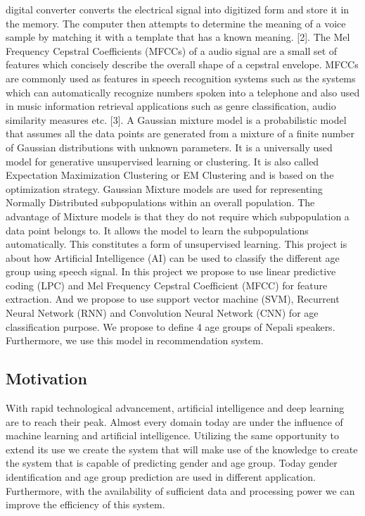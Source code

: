\documentclass[a4paper,12pt]{article}
\begin{document}
{digital converter converts the electrical signal into digitized form and store it in the memory.
The computer then attempts to determine the meaning of a voice sample by matching it with a
template that has a known meaning. [2]. The Mel Frequency Cepstral Coefficients (MFCCs)
of a audio signal are a small set of features which concisely describe the overall shape of a
cepstral envelope. MFCCs are commonly used as features in speech recognition systems such
as the systems which can automatically recognize numbers spoken into a telephone and also
used in music information retrieval applications such as genre classification, audio similarity
measures etc. [3]. A Gaussian mixture model is a probabilistic model that assumes all the data
points are generated from a mixture of a finite number of Gaussian distributions with unknown
parameters. It is a universally used model for generative unsupervised learning or clustering. It
is also called Expectation Maximization Clustering or EM Clustering and is based on the
optimization strategy. Gaussian Mixture models are used for representing Normally
Distributed subpopulations within an overall population. The advantage of Mixture models is
that they do not require which subpopulation a data point belongs to. It allows the model to
learn the subpopulations automatically. This constitutes a form of unsupervised learning.
This project is about how Artificial Intelligence (AI) can be used to classify the different age
group using speech signal. In this project we propose to use linear predictive coding (LPC) and
Mel Frequency Cepstral Coefficient (MFCC) for feature extraction. And we propose to use
support vector machine (SVM), Recurrent Neural Network (RNN) and Convolution Neural
Network (CNN) for age classification purpose. We propose to define 4 age groups of Nepali
speakers. Furthermore, we use this model in recommendation system.}


\subsection{Motivation}
{With rapid technological advancement, artificial intelligence and deep learning are to reach
their peak. Almost every domain today are under the influence of machine learning and artificial intelligence. Utilizing the same opportunity to extend its use we create the system that will make
use of the knowledge to create the system that is capable of predicting gender and age group. Today gender identification and age group prediction are used in different application. Furthermore, with the availability of sufficient data and processing power we can improve the efficiency of this system.}
\end{document}
